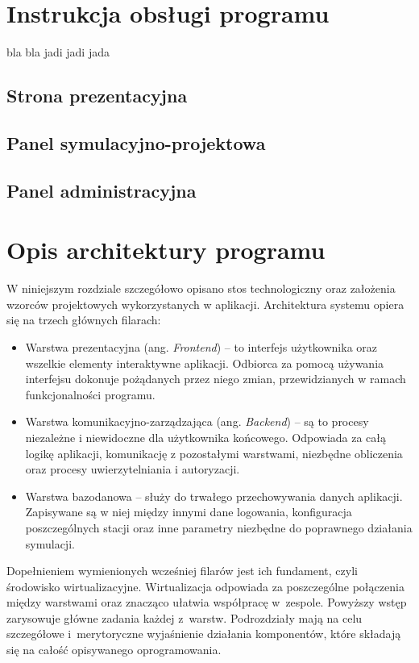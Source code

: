 \documentclass[twoside]{projektInzynierskiMS1z}
\begin{document}
\section{Instrukcja obsługi programu}
bla bla jadi jadi jada
\subsection{Strona prezentacyjna} 
\subsection{Panel symulacyjno-projektowa}
\subsection{Panel administracyjna}

\section{Opis architektury programu}
W niniejszym rozdziale szczegółowo opisano stos technologiczny oraz założenia wzorców projektowych wykorzystanych w aplikacji. 
Architektura systemu opiera się na trzech głównych filarach:
\begin{itemize}
    \item Warstwa prezentacyjna (ang. \emph{Frontend}) -- to interfejs użytkownika oraz wszelkie elementy interaktywne aplikacji. Odbiorca za pomocą używania interfejsu dokonuje pożądanych przez niego zmian, przewidzianych w ramach funkcjonalności programu.
    \item Warstwa komunikacyjno-zarządzająca (ang. \emph{Backend}) -- są to procesy niezależne i niewidoczne dla użytkownika końcowego. Odpowiada za całą logikę aplikacji, komunikację z pozostałymi warstwami, niezbędne obliczenia oraz procesy uwierzytelniania i autoryzacji.
    \item Warstwa bazodanowa -- służy do trwałego przechowywania danych aplikacji. Zapisywane są w niej między innymi dane logowania, konfiguracja poszczególnych stacji oraz inne parametry niezbędne do poprawnego działania symulacji.
\end{itemize}
Dopełnieniem wymienionych wcześniej filarów jest ich fundament, czyli środowisko wirtualizacyjne. Wirtualizacja odpowiada za poszczególne połączenia między warstwami oraz znacząco ułatwia współpracę w~zespole. Powyższy wstęp zarysowuje główne zadania każdej z~warstw. Podrozdziały mają na celu szczegółowe i~merytoryczne wyjaśnienie działania komponentów, które składają się na całość opisywanego oprogramowania.
\end{document}
